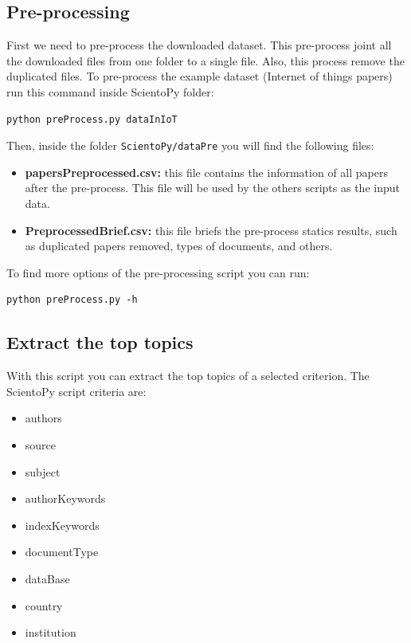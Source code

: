 \documentclass[10pt,letterpaper]{article}
\begin{document}
\subsection{Pre-processing}

First we need to pre-process the downloaded dataset. This pre-process joint all the downloaded files from one folder to a single file. Also, this process remove the duplicated files. To pre-process the example dataset (Internet of things papers) run this command inside ScientoPy folder: 
\begin{verbatim}
python preProcess.py dataInIoT
\end{verbatim}

Then, inside the folder \verb|ScientoPy/dataPre| you will find the following files: 
\begin{itemize}
\item \textbf{papersPreprocessed.csv:} this file contains the information of all papers after the pre-process. This file will be used by the others scripts as the input data. 
\item \textbf{PreprocessedBrief.csv:} this file briefs the pre-process statics results, such as duplicated papers removed, types of documents, and others. 
\end{itemize}

To find more options of the pre-processing script you can run:
\begin{verbatim}
python preProcess.py -h
\end{verbatim}

\subsection{Extract the top topics}

With this script you can extract the top topics of a selected criterion. The ScientoPy script criteria are:

\begin{itemize}
\item authors
\item source
\item subject 
\item authorKeywords 
\item indexKeywords 
\item documentType 
\item dataBase 
\item country
\item institution
\end{itemize}
\end{document}
